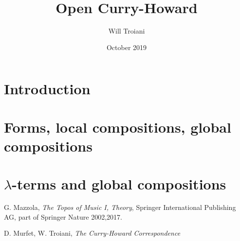 \documentclass[12pt]{article}
\title{Open Curry-Howard}
\author{Will Troiani}
\date{October 2019}
\numberwithin{thm}{subsection}
\numberwithin{defn}{subsection}
\numberwithin{lemma}{subsection}
\numberwithin{example}{subsection}
\numberwithin{notation}{subsection}
\numberwithin{cor}{subsection}
\numberwithin{remark}{subsection}
\numberwithin{condition}{subsection}
\numberwithin{question}{subsection}
\numberwithin{question}{subsection}
\begin{document}
 \section{Introduction}
 
 
 \section{Forms, local compositions, global compositions}
 
 
 \section{$\lambda$-terms and global compositions}
 
 
 \begin{thebibliography}{9}
  G. Mazzola, \emph{The Topos of Music I, Theory}, Springer International Publishing AG, part of Springer Nature 2002,2017.
 
  D. Murfet, W. Troiani, \emph{The Curry-Howard Correspondence}
 \end{thebibliography}
 
 
\end{document}
